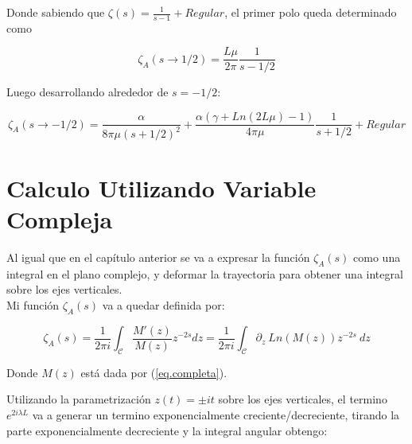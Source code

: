 Donde sabiendo que $\zeta(s) = \frac{1}{s-1} + Regular$, el primer polo queda determinado como

\begin{equation}
    \zeta _A (s \rightarrow 1/2) = \frac{L \mu }{2 \pi} \frac{1}{s-1/2}    
\end{equation}

Luego desarrollando alrededor de $s=-1/2$:

\begin{equation}
    \zeta _A (s \rightarrow -1/2 ) =  \frac{\alpha}{8  \pi \mu (s+1/2)^2} +
     \frac{ \alpha ( \gamma  + Ln(2L \mu ) -1 ) }{4  \pi \mu } \frac{1}{s+1/2} + 
    Regular
\end{equation}

\section{Calculo Utilizando Variable Compleja}


Al igual que en el capítulo anterior se va a expresar la función $\zeta _A (s)$ como una integral en el plano complejo, y deformar la trayectoria para obtener una integral sobre los ejes verticales. \\

Mi función $ \zeta _A (s) $ va a quedar definida por:

\begin{equation}
\zeta _A (s) = 
\frac{1}{2 \pi i} 
\int _{\mathcal{C}}
\frac{M ' ( z ) }{ M ( z ) } z ^{-2s} d z = 
\frac{1}{2 \pi i} 
\int _{\mathcal{C}}
\partial _z \ Ln (	M(z) ) z ^{-2s} \ dz
\label{eq.zeta.compleja}
\end{equation}

Donde $M ( z )$ está dada por (\ref{eq.completa}).

Utilizando la parametrización $ z (t) = \pm i t$ sobre los ejes verticales, el termino $e ^{2 i \lambda L}$ va a generar un termino exponencialmente creciente/decreciente, tirando la parte exponencialmente decreciente y la integral angular obtengo:

\begin{comment}

\begin{equation}
\begin{array}{c}
    \zeta _A (s) = \\
     \frac{1}{2 \pi i} \int _{\infty} ^{1}
     \frac{ i \alpha }{2 t^2} 
     \left(
      1 + \frac{i \pi}{2} + Ln[2 t] + \psi (1 + \frac{\beta}{2 t})
     \right)
     t ^{-2s}
     e ^{- i \pi s} (i dt) + \\
     \frac{1}{2 \pi i} \int _{\infty} ^{1} 
     \left(
     2 + \frac{\beta}{2 t^2}
     \left(
     1 + \frac{i \pi}{2} - Ln[2 t] - \psi (1+ \frac{\beta}{2 t})
     \right)
     t ^{-2s}
     e ^{ i \pi s} (-i dt)
     \right)     
\end{array}
\end{equation}

\end{comment}

